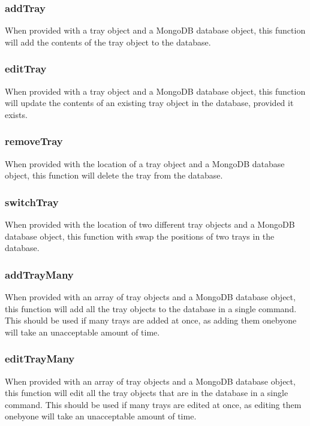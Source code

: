 \documentclass[letterpaper,10pt,english]{sphinxmanual}
\begin{document}
\subsubsection{addTray}
\label{\detokenize{docs/System_Overview/Backend_overview:addtray}}
When provided with a tray object and a MongoDB database object, this
function will add the contents of the tray object to the database.


\subsubsection{editTray}
\label{\detokenize{docs/System_Overview/Backend_overview:edittray}}
When provided with a tray object and a MongoDB database object, this
function will update the contents of an existing tray object in the
database, provided it exists.


\subsubsection{removeTray}
\label{\detokenize{docs/System_Overview/Backend_overview:removetray}}
When provided with the location of a tray object and a MongoDB database
object, this function will delete the tray from the database.


\subsubsection{switchTray}
\label{\detokenize{docs/System_Overview/Backend_overview:switchtray}}
When provided with the location of two different tray objects and a
MongoDB database object, this function with swap the positions of two
trays in the database.


\subsubsection{addTrayMany}
\label{\detokenize{docs/System_Overview/Backend_overview:addtraymany}}
When provided with an array of tray objects and a MongoDB database
object, this function will add all the tray objects to the database in a
single command. This should be used if many trays are added at once, as
adding them one\sphinxhyphen{}by\sphinxhyphen{}one will take an unacceptable amount of time.


\subsubsection{editTrayMany}
\label{\detokenize{docs/System_Overview/Backend_overview:edittraymany}}
When provided with an array of tray objects and a MongoDB database
object, this function will edit all the tray objects that are in the
database in a single command. This should be used if many trays are
edited at once, as editing them one\sphinxhyphen{}by\sphinxhyphen{}one will take an unacceptable
amount of time.
\end{document}
